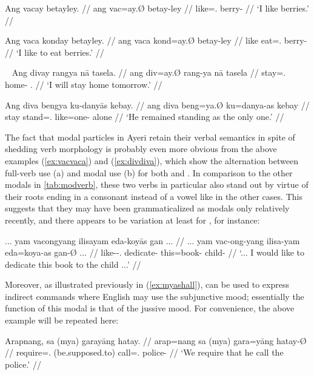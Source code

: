 \pex\label{ex:vacvaca}
\a\label{ex:vacfull}\begingl
	\gla Ang vacay betayley. //
	\glb ang vac=ay.Ø betay-ley //
	\glc \AgtT{} like=\Fsg{}.\Top{} berry-\PargI{} //
	\glft `I like berries.' //
\endgl

\a\label{ex:vacamod}\begingl
	\gla Ang vaca konday betayley. //
	\glb ang vaca kond=ay.Ø betay-ley //
	\glc \AgtT{} like eat=\Fsg{}.\Top{} berry-\PargI{} //
	\glft `I like to eat berries.' //
\endgl
\xe

\pex~\label{ex:divdiva}
\a\label{ex:divfull}\begingl
	\gla Ang divay rangya nā tasela. //
	\glb ang div=ay.Ø rang-ya nā tasela //
	\glc \AgtT{} stay=\Fsg{}.\Top{} home-\Loc{} \Fsg{}.\Gen{} //
	\glft `I will stay home tomorrow.' //
\endgl

\a\label{ex:divamod}\begingl
	\gla Ang diva bengya ku-danyās kebay. //
	\glb ang diva beng=ya.Ø ku=danya-as kebay //
	\glc \AgtT{} stay stand=\TsgM{}.\Top{} like=one-\Parg{} alone //
	\glft `He remained standing as the only one.' //
\endgl
\xe

The fact that modal particles in Ayeri retain their verbal semantics in spite 
of shedding verb morphology is probably even more obvious from the above 
examples (\ref{ex:vacvaca}) and (\ref{ex:divdiva}), which show the alternation 
between full-verb use (a) and modal use (b) for both  and 
. In comparison to the other modals in 
\autoref{tab:modverb}, these two verbs in particular also stand out by virtue 
of their roots ending in a consonant instead of a vowel like in the other 
cases. This suggests that they may have been grammaticalized as modals 
only relatively recently, and there appears to be variation at least for 
, for instance:

\ex\begingl
	\gla ... yam vacongyang ilisayam eda-koyās gan ... //
	\glb ... yam vac-ong-yang ilisa-yam eda=koya-as gan-Ø ... //
	\glc {} \DatT{} like-\Irr{}-\Fsg{}.\Aarg{} dedicate-\Ptcp{} 		
		this=book-\Parg{} child-\Top{} {} //
	\glft `... I would like to dedicate this book to the child ...' 
		 //
\endgl\xe

Moreover, as illustrated previously in (\ref{ex:myashall}),  can be used to express indirect commands where English may 
use the subjunctive mood; essentially the function of this modal is that of 
the jussive mood. For convenience, the above example will be repeated here:

\ex\begingl
	\gla Arapnang, sa {\normalfont (}mya{\normalfont )} garayāng hatay. //
	\glb arap=nang sa (mya) gara=yāng hatay-Ø //
	\glc require=\Fpl{}.\Aarg{} \PatT{} (be.supposed.to) 
		call=\TsgM{}.\Aarg{} police-\Top{} //
	\glft `We require that he call the police.' //
\endgl\xe

